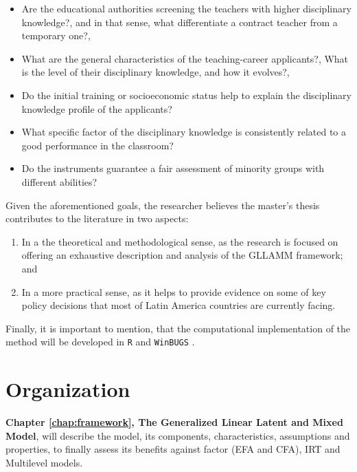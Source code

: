 \begin{itemize}
	\item Are the educational authorities screening the teachers with higher disciplinary knowledge?, and in that sense, what differentiate a contract teacher from a temporary one?,
	
	\item What are the general characteristics of the teaching-career applicants?, What is the level of their disciplinary knowledge, and how it evolves?, 
	
	\item Do the initial training or socioeconomic status help to explain the disciplinary knowledge profile of the applicants?
	
	\item What specific factor of the disciplinary knowledge is consistently related to a good performance in the classroom?
	
	\item Do the instruments guarantee a fair assessment of minority groups with different abilities?
\end{itemize}

\noindent Given the aforementioned goals, the researcher believes the master's thesis contributes to the literature in two aspects: 

\begin{enumerate}
	\item In a the theoretical and methodological sense, as the research is focused on offering an exhaustive description and analysis of the GLLAMM framework; and 
	
	\item In a more practical sense, as it helps to provide evidence on some of key policy decisions that most of Latin America countries are currently facing.
\end{enumerate}

\noindent Finally, it is important to mention, that the computational implementation of the method will be developed in {\color{red} \texttt{R}} \citep{R2015} and {\color{red}\texttt{WinBUGS}} \citep{Lunn_et_al_2000}.



\section{Organization}

\textbf{Chapter \ref{chap:framework}, The Generalized Linear Latent and Mixed Model}, will describe the model, its components, characteristics, assumptions and properties, to finally assess its benefits against factor (EFA and CFA), IRT and Multilevel models.

